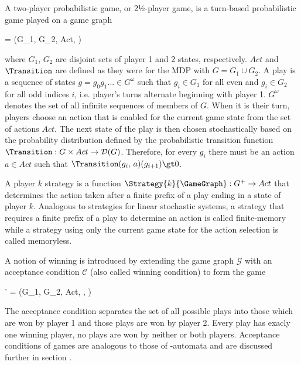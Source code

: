 \stopsubsection


\startsubsection[title={2-Player Probabilistic Games},reference=sec:theory-games-games]

    A two-player probabilistic game, or 2½-player game, is a turn-based probabilistic game played on a game graph

    \startformula
        \GameGraph = (G_1, G_2, Act, \Transition) \EndComma
    \stopformula

    where $G_1$, $G_2$ are disjoint sets of player 1 and 2 states, respectively.
    $Act$ and $\Transition$ are defined as they were for the MDP with $G = G_1 \cup G_2$.
    A play is a sequence of states $g = g_0 g_1 ... \in G^\omega$ such that $g_i \in G_1$ for all even and $g_i \in G_2$ for all odd indices $i$, i.e. player's turns alternate beginning with player 1.
    $G^\omega$ denotes the set of all infinite sequences of members of $G$.
    When it is their turn, players choose an action that is enabled for the current game state from the set of actions $Act$.
    The next state of the play is then chosen stochastically based on the probability distribution defined by the probabilistic transition function $\Transition: G \times Act \rightarrow \mathcal{D}(G)$.
    Therefore, for every $g_i$ there must be an action $a \in Act$ such that $\Transition(g_i,\, a)(g_{i+1}) \gt 0$.

    A player $k$ strategy is a function $\Strategy{k}{\GameGraph}: G^+ \rightarrow Act$ that determines the action taken after a finite prefix of a play ending in a state of player $k$.
    Analogous to strategies for linear stochastic systems, a strategy that requires a finite prefix of a play to determine an action is called finite-memory while a strategy using only the current game state for the action selection is called memoryless.

\stopsubsection


\startsubsection[title={Winning and Solving 2-Player Probabilistic Games}]

    A notion of winning is introduced by extending the game graph $\mathcal{G}$ with an acceptance condition $\mathcal{C}$ (also called winning condition) to form the game

    \startformula
        \GameGraph' = (G_1, G_2, Act, \Transition, \Condition) \EndPeriod
    \stopformula

    The acceptance condition separates the set of all possible plays into those which are won by player 1 and those plays are won by player 2.
    Every play has exacly one winning player, no plays are won by neither or both players.
    Acceptance conditions of games are analogous to those of \omega-automata and are discussed further in section .

